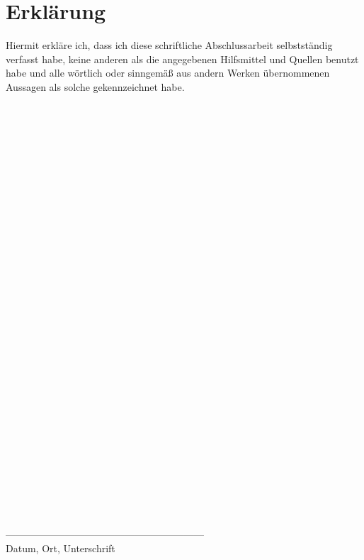 \section*{Erklärung}
Hiermit erkläre ich, dass ich diese schriftliche Abschlussarbeit selbstständig verfasst habe, keine anderen als die angegebenen Hilfsmittel und Quellen benutzt habe und alle wörtlich oder sinngemäß aus andern Werken übernommenen Aussagen als solche gekennzeichnet habe.
\begin{verbatim}




































\end{verbatim}
\begin{flushright}
	------------------------------------------------------------\\
	\small Datum, Ort, Unterschrift
\end{flushright}